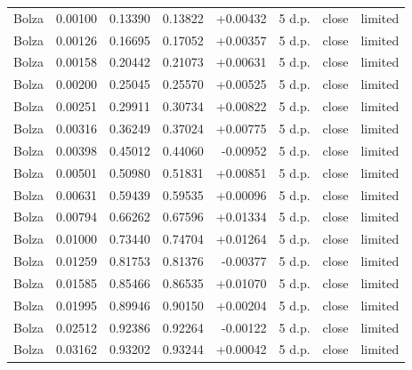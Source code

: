 \begin{longtable}{llrrrrll}
Bolza & 0.00100 & 0.13390 & 0.13822 & +0.00432 & 5 d.p. & close & limited \\
Bolza & 0.00126 & 0.16695 & 0.17052 & +0.00357 & 5 d.p. & close & limited \\
Bolza & 0.00158 & 0.20442 & 0.21073 & +0.00631 & 5 d.p. & close & limited \\
Bolza & 0.00200 & 0.25045 & 0.25570 & +0.00525 & 5 d.p. & close & limited \\
Bolza & 0.00251 & 0.29911 & 0.30734 & +0.00822 & 5 d.p. & close & limited \\
Bolza & 0.00316 & 0.36249 & 0.37024 & +0.00775 & 5 d.p. & close & limited \\
Bolza & 0.00398 & 0.45012 & 0.44060 & -0.00952 & 5 d.p. & close & limited \\
Bolza & 0.00501 & 0.50980 & 0.51831 & +0.00851 & 5 d.p. & close & limited \\
Bolza & 0.00631 & 0.59439 & 0.59535 & +0.00096 & 5 d.p. & close & limited \\
Bolza & 0.00794 & 0.66262 & 0.67596 & +0.01334 & 5 d.p. & close & limited \\
Bolza & 0.01000 & 0.73440 & 0.74704 & +0.01264 & 5 d.p. & close & limited \\
Bolza & 0.01259 & 0.81753 & 0.81376 & -0.00377 & 5 d.p. & close & limited \\
Bolza & 0.01585 & 0.85466 & 0.86535 & +0.01070 & 5 d.p. & close & limited \\
Bolza & 0.01995 & 0.89946 & 0.90150 & +0.00204 & 5 d.p. & close & limited \\
Bolza & 0.02512 & 0.92386 & 0.92264 & -0.00122 & 5 d.p. & close & limited \\
Bolza & 0.03162 & 0.93202 & 0.93244 & +0.00042 & 5 d.p. & close & limited \\
\bottomrule
\end{longtable}
